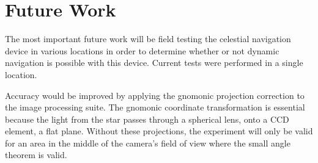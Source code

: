 \documentclass[]{aiaa-tc}%
\begin{document}
\section{Future Work}
The most important future work will be field testing the celestial navigation device in various locations in order to determine whether or not dynamic navigation is possible with this device.  Current tests were performed in a single location.

Accuracy would be improved by applying the gnomonic projection correction to the image processing suite.  The gnomonic coordinate transformation is essential because the light from the star passes through a spherical lens, onto a CCD element, a flat plane\cite{b:gnomonic}.  %
%
Without these projections, the experiment will only be valid for an area in the middle of the camera's field of view where the small angle theorem is valid.
\end{document}
